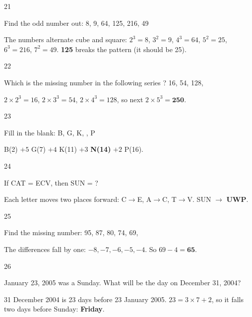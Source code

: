 \begin{question}{21}
{Find the odd number out: 8, 9, 64, 125, 216, 49\par}
\begin{explain}
The numbers alternate cube and square: $2^3=8$, $3^2=9$, $4^3=64$, $5^2=25$, $6^3=216$, $7^2=49$. \textbf{125} breaks the pattern (it should be 25).
\end{explain}
\end{question}

\begin{question}{22}
{Which is the missing number in the following series ? 16, 54, 128, \blank{}\par}
\begin{explain}
$2\times2^3=16$, $2\times3^3=54$, $2\times4^3=128$, so next $2\times5^3=\mathbf{250}$.
\end{explain}
\end{question}

\begin{question}{23}
{Fill in the blank: B, G, K, \blank{}, P\par}
\begin{explain}
B(2) $+5$ G(7) $+4$ K(11) $+3$ \textbf{N(14)} $+2$ P(16).
\end{explain}
\end{question}

\begin{question}{24}
{If CAT = ECV, then SUN = ?\par}
\begin{explain}
Each letter moves two places forward: C$\rightarrow$E, A$\rightarrow$C, T$\rightarrow$V. SUN $\rightarrow$ \textbf{UWP}.
\end{explain}
\end{question}

\begin{question}{25}
{Find the missing number: 95, 87, 80, 74, 69, \blank{}\par}
\begin{explain}
The differences fall by one: $-8, -7, -6, -5, -4$. So $69-4=\mathbf{65}$.
\end{explain}
\end{question}

\begin{question}{26}
{January 23, 2005 was a Sunday. What will be the day on December 31, 2004?\par}
\begin{explain}
31 December 2004 is 23 days before 23 January 2005. $23=3\times7+2$, so it falls two days before Sunday: \textbf{Friday}.
\end{explain}
\end{question}

